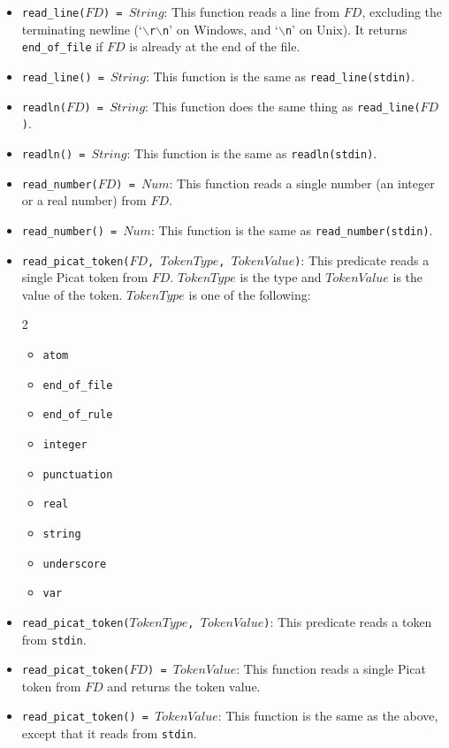 \begin{itemize}
\item \texttt{read\_line($FD$) = $String$}: This function reads a line from $FD$, excluding the terminating newline (`\texttt{$\backslash$r$\backslash$n}' on Windows, and `\texttt{$\backslash$n}' on Unix). It returns \texttt{end\_of\_file} if $FD$ is already at the end of the file.
\item \texttt{read\_line() = $String$}: This function is the same as \texttt{read\_line(stdin)}.
\item \texttt{readln($FD$) = $String$}: This function does the same thing as \texttt{read\_line($FD$)}.
\item \texttt{readln() = $String$}: This function is the same as \texttt{readln(stdin)}.

\item \texttt{read\_number($FD$) = $Num$}: This function reads a single number (an integer or a real number) from $FD$. 

\item \texttt{read\_number() = $Num$}: This function is the same as \texttt{read\_number(stdin)}.

\item \texttt{read\_picat\_token($FD$, $TokenType$, $TokenValue$)}: This predicate reads a single Picat token from $FD$. $TokenType$ is the type and $TokenValue$ is the value of the token. $TokenType$ is one of the following: 
\begin{multicols}{2}
\begin{itemize}
\item \texttt{atom}
\item \texttt{end\_of\_file}
\item \texttt{end\_of\_rule}
\item \texttt{integer}
\item \texttt{punctuation}
\item \texttt{real}
\item \texttt{string}
\item \texttt{underscore}
\item \texttt{var}
\end{itemize}
\end{multicols}
\item \texttt{read\_picat\_token($TokenType$, $TokenValue$)}: This predicate reads a token from \texttt{stdin}.
\item \texttt{read\_picat\_token($FD$) = $TokenValue$}: This function reads a single Picat token from $FD$ and returns the token value.
\item \texttt{read\_picat\_token() = $TokenValue$}: This function is the same as the above, except that it reads from {\tt stdin}.


\end{itemize}
